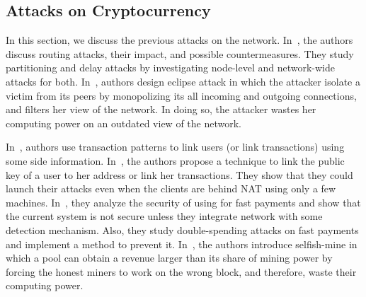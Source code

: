  

  \subsection{Attacks on \bc Cryptocurrency}
 In this section, we discuss the previous attacks on the \bc network. 
 In~\cite{hijack}, the authors discuss routing attacks, their impact, and possible countermeasures. They study partitioning and delay attacks by investigating node-level and network-wide attacks for both. 
In~\cite{eclipse}, authors design eclipse attack in which the attacker isolate a victim from its peers by monopolizing its all incoming and outgoing connections, and filters her view of the network. In doing so, the attacker wastes her computing power on an outdated view of the network.

In~\cite{analysis_anon,privacy_anon}, authors use \bc transaction patterns
to link users (or link transactions) using some side information.
In~\cite{deanom1}, the authors propose a technique to link the public key of a user to her address or link her transactions. They show that they could launch their attacks even when the clients are behind NAT using only a few machines.
 In~\cite{double}, they analyze the security of using \bc for fast payments and show that the current \bc system is not secure unless they integrate \bc network with some detection mechanism.
 Also, they study double-spending attacks on fast payments and implement a method to prevent it.
 In~\cite{majority}, the authors introduce selfish-mine in which a pool can obtain a revenue larger than its share of mining power by forcing the honest miners to work on the wrong block, and therefore, waste their computing power.

